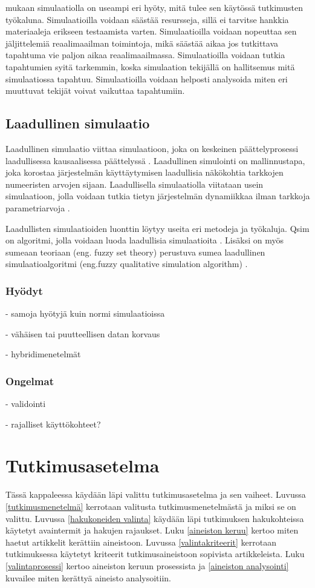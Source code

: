 \documentclass[utf8]{gradu3}
\begin{document}
\cite{banks1999introduction} mukaan simulaatiolla on useampi eri hyöty, mitä tulee sen käytössä tutkimusten työkaluna. Simulaatioilla voidaan säästää resursseja, sillä ei tarvitse hankkia materiaaleja erikseen testaamista varten. Simulaatioilla voidaan nopeuttaa sen jäljittelemiä reaalimaailman toimintoja, mikä säästää aikaa jos tutkittava tapahtuma vie paljon aikaa reaalimaailmassa. Simulaatioilla voidaan tutkia tapahtumien syitä tarkemmin, koska simulaation tekijällä on hallitsemus mitä simulaatiossa tapahtuu. Simulaatioilla voidaan helposti analysoida miten eri muuttuvat tekijät voivat vaikuttaa tapahtumiin.

\section{Laadullinen simulaatio} \label{laadullinen simulaatio}
Laadullinen simulaatio viittaa simulaatioon, joka on keskeinen päättelyprosessi laadullisessa kausaalisessa päättelyssä \parencite{kuipers1986qualitative}. Laadullinen simulointi on mallinnustapa, joka korostaa järjestelmän käyttäytymisen laadullisia näkökohtia tarkkojen numeeristen arvojen sijaan. Laadullisella simulaatiolla viitataan usein simulaatioon, jolla voidaan tutkia tietyn järjestelmän dynamiikkaa ilman tarkkoja parametriarvoja \parencite{cosme2023history}.

Laadullisten simulaatioiden luonttin löytyy useita eri metodeja ja työkaluja.
Qsim on algoritmi, jolla voidaan luoda laadullisia simulaatioita \parencite{kuipers1986qualitative}. Lisäksi on myös sumeaan teoriaan (eng. fuzzy set theory) perustuva sumea laadullinen simulaatioalgoritmi (eng.fuzzy qualitative simulation algorithm) \parencite{shen1993fuzzy}.

\subsection{Hyödyt}
- samoja hyötyjä kuin normi simulaatioissa

- vähäisen tai puutteellisen datan korvaus

- hybridimenetelmät \parencite{semiHybrid1997qualitative}

\subsection{Ongelmat}
- validointi

- rajalliset käyttökohteet?

\chapter{Tutkimusasetelma}
Tässä kappaleessa käydään läpi valittu tutkimusasetelma ja sen vaiheet. Luvussa \ref{tutkimusmenetelmä} kerrotaan valitusta tutkimusmenetelmästä ja miksi se on valittu. Luvussa \ref{hakukoneiden valinta} käydään läpi tutkimuksen hakukohteissa käytetyt avaintermit ja hakujen rajaukset. Luku \ref{aineiston keruu} kertoo miten haetut artikkelit kerättiin aineistoon. Luvussa \ref{valintakriteerit} kerrotaan tutkimuksessa käytetyt kriteerit tutkimusaineistoon sopivista artikkeleista. Luku \ref{valintaprosessi} kertoo aineiston keruun prosessista ja \ref{aineiston analysointi} kuvailee miten kerättyä aineisto analysoitiin.
\end{document}
